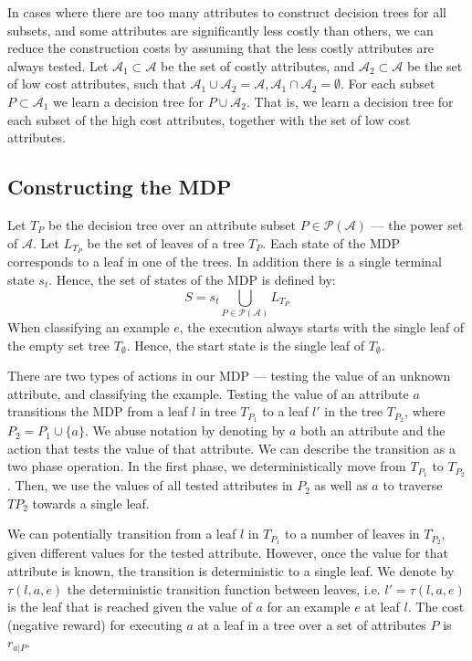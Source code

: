 \documentclass[letterpaper]{article}
\theoremstyle{definition}
\begin{document}
In cases where there are too many attributes to construct decision trees for all subsets, and some attributes are significantly less costly than others, we can reduce the construction costs by assuming that the less costly attributes are always tested. Let $\mathcal{A}_1 \subset \mathcal{A}$ be the set of costly attributes, and $\mathcal{A}_2 \subset \mathcal{A}$ be the set of low cost attributes, such that $\mathcal{A}_1 \cup \mathcal{A}_2 = \mathcal{A}, \mathcal{A}_1 \cap \mathcal{A}_2 = \emptyset$. For each subset $P \subset \mathcal{A}_1$ we learn a decision tree for $P \cup \mathcal{A}_2$.
That is, we learn a decision tree for each subset of the high cost attributes, together with the set of low cost attributes.

\subsection{Constructing the MDP}

Let $T_P$ be the decision tree over an attribute subset $P \in \mathcal{P}(\mathcal{A})$ --- the power set of $\mathcal{A}$. Let $L_{T_P}$ be the set of leaves of a tree $T_P$.
Each state of the MDP corresponds to a leaf in one of the trees. In addition there is a single terminal state $s_t$. Hence, the set of states of the MDP is defined by:
\begin{equation}
S=s_t \bigcup_{P \in \mathcal{P}(\mathcal{A})}L_{T_P}
\end{equation}
When classifying an example $e$, the execution always starts with the single leaf of the empty set tree $T_{\emptyset}$. Hence, the start state is the single leaf of $T_{\emptyset}$.

There are two types of actions in our MDP --- testing the value of an unknown attribute, and classifying the example. Testing the value of an attribute $a$ transitions the MDP from a leaf $l$ in tree $T_{P_1}$ to a leaf $l'$ in the tree $T_{P_2}$, where $P_2 = P_1 \cup \{a\}$. We abuse notation by denoting by $a$ both an attribute and the action that tests the value of that attribute. We can describe the transition as a two phase operation. In the first phase, we deterministically move from $T_{P_1}$ to $T_{P_2}$. Then, we use the values of all tested attributes in $P_2$ as well as $a$ to traverse $T{P_2}$ towards a single leaf. 

We can potentially transition from a leaf $l$ in $T_{P_1}$ to a number of leaves in $T_{P_2}$, given different values for the tested attribute. However, once the value for that attribute is known, the transition is deterministic to a single leaf. We denote by $\tau(l,a,e)$ the deterministic transition function between leaves, i.e. $l'=\tau(l,a,e)$ is the leaf that is reached given the value of $a$ for an example $e$ at leaf $l$. The cost (negative reward) for executing $a$ at a leaf in a tree over a set of attributes $P$ is $r_{a|P}$. 
\end{document}
